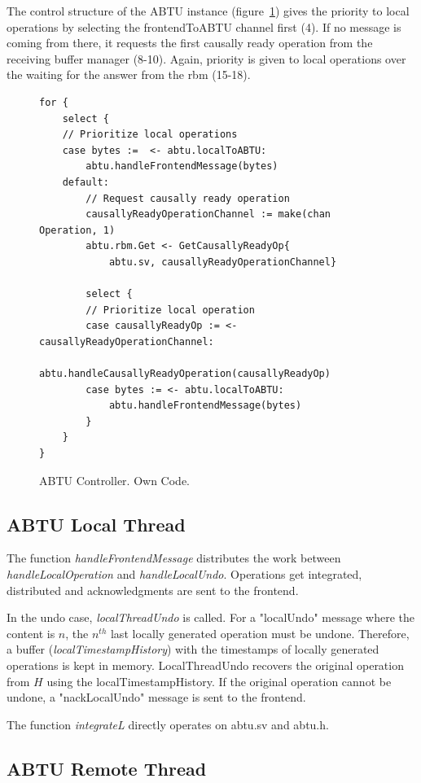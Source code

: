 \documentclass[11pt, a4paper, oneside, openright]{article} %
\begin{document}
The control structure of the ABTU instance (figure~\ref{code:abtucontrol}) gives the priority to local operations by selecting the frontendToABTU channel first (4). If no message is coming from there, it requests the first causally ready operation from the receiving buffer manager (8-10). Again, priority is given to local operations over the waiting for the answer from the rbm (15-18).

\begin{figure}[!h]
\begin{center}
\begin{lstlisting}
for {
	select {
	// Prioritize local operations
	case bytes :=  <- abtu.localToABTU:
		abtu.handleFrontendMessage(bytes)
	default:
		// Request causally ready operation
		causallyReadyOperationChannel := make(chan Operation, 1)
		abtu.rbm.Get <- GetCausallyReadyOp{
			abtu.sv, causallyReadyOperationChannel}

		select {
		// Prioritize local operation
		case causallyReadyOp := <- causallyReadyOperationChannel:
			abtu.handleCausallyReadyOperation(causallyReadyOp)
		case bytes := <- abtu.localToABTU:
			abtu.handleFrontendMessage(bytes)
		}
	}
}
\end{lstlisting}
\end{center}
\caption{ABTU Controller. Own Code.\label{code:abtucontrol}}
\end{figure}

\subsection{ABTU Local Thread}

The function \textit{handleFrontendMessage} distributes the work between \textit{handleLocalOperation} and \textit{handleLocalUndo}. Operations get integrated, distributed and acknowledgments are sent to the frontend.

In the undo case, \textit{localThreadUndo} is called. For a  "localUndo" message where the content is $n$, the $n^{th}$ last locally generated operation must be undone. Therefore, a buffer (\textit{localTimestampHistory}) with the timestamps of locally generated operations is kept in memory. LocalThreadUndo recovers the original operation from $H$ using the localTimestampHistory. If the original operation cannot be undone, a "nackLocalUndo" message is sent to the frontend.

The function \textit{integrateL} directly operates on abtu.sv and abtu.h.

\subsection{ABTU Remote Thread}
\end{document}
